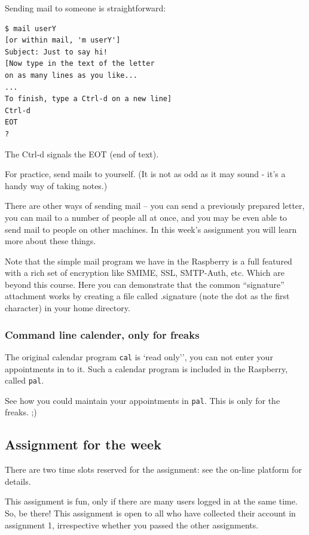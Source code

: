 \documentclass[11pt,a4paper,twoside]{article}
\begin{document}
Sending mail to someone is straightforward:

\begin{lstlisting}[frame=single]
$ mail userY
[or within mail, 'm userY']
Subject: Just to say hi!
[Now type in the text of the letter
on as many lines as you like...
...
To finish, type a Ctrl-d on a new line]
Ctrl-d
EOT
?
\end{lstlisting}

The Ctrl-d signals the EOT (end of text). 

For practice, send mails to yourself. (It is not as odd as it may sound
 - it's a handy way of taking notes.)

There are other ways of sending mail -- you can send a previously prepared
letter, you can mail to a number of people all at once, and you may be even
able to send mail to people on other machines. In this week's assignment you 
will learn more about these things.

Note that the simple mail program we have in the Raspberry is a full
featured with a rich set of encryption like SMIME, SSL, SMTP-Auth, etc.
Which are beyond this course. Here you can demonstrate that the common
``signature'' attachment works by creating a file called .signature (note
the dot as the first character) in your home directory.

\subsubsection{Command line calender, only for freaks}

The original calendar program \texttt{cal} is `read only'', you can not
enter your appointments in to it. Such a calendar program is included
in the Raspberry, called \texttt{pal}.

See how you could maintain your appointments in \texttt{pal}. This is only
for the freaks. ;)

\subsection{Assignment for the week}

There are two time slots reserved for the assignment: see the on-line
platform for details. 

This assignment is fun, only if there are many users logged in at the 
same time. So, be there! This assignment is open to all who have collected 
their account in assignment 1, irrespective whether you passed the other 
assignments.
\end{document}
